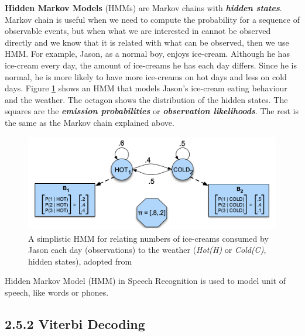 \documentclass[nobib]{tufte-handout}
\begin{document}
\textbf{Hidden Markov Models} (HMMs) are Markov chains with \textbf{\textit{hidden states}}. Markov chain is useful when we need to compute the probability for a sequence of observable events, but when what we are interested in cannot be observed directly and we know that it is related with what can be observed, then we use HMM. For example, Jason, as a normal boy, enjoys ice-cream. Although he has ice-cream every day, the amount of ice-creams he has each day differs. Since he is normal, he is more likely to have more ice-creams on hot days and less on cold days. Figure \ref{fig:hmm} shows an HMM that models Jason's ice-cream eating behaviour and the weather. The octagon shows the distribution of the hidden states. The squares are the \textbf{\textit{emission probabilities}} or \textbf{\textit{observation likelihoods}}. The rest is the same as the Markov chain explained above.\\
\vspace{5em}
\begin{figure}
 \includegraphics[width=1\textwidth]{hmm.png}
  \caption{A simplistic HMM for relating numbers of ice-creams consumed by Jason each day (observations) to the weather (\textit{Hot(H)} or \textit{Cold(C)}, hidden states), adopted from \cite{slp}}
  \label{fig:hmm}
\end{figure}
Hidden Markov Model (HMM) in Speech Recognition is used to model unit of speech, like words or phones.

\subsection{2.5.2 \textbf{Viterbi Decoding}}
\end{document}
